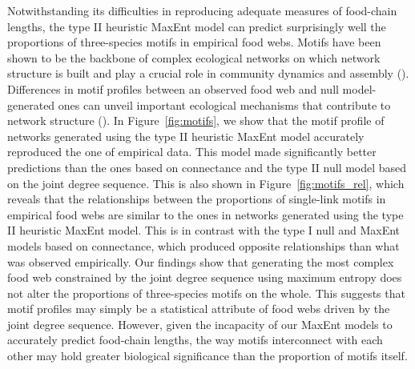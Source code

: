 Notwithstanding its difficulties in reproducing adequate measures of food-chain
lengths, the type II heuristic MaxEnt model can predict surprisingly well the
proportions of three-species motifs in empirical food webs. Motifs have been
shown to be the backbone of complex ecological networks on which network
structure is built and play a crucial role in community dynamics and assembly
(\cite{Stouffer2011Compartmentalization}). Differences in motif profiles between an observed
food web and null model-generated ones can unveil important ecological
mechanisms that contribute to network structure (\cite{Stouffer2007Evidence}). In
Figure~\ref{fig:motifs}, we show that the motif profile of networks generated using the
type II heuristic MaxEnt model accurately reproduced the one of empirical data.
This model made significantly better predictions than the ones based on
connectance and the type II null model based on the joint degree sequence. This
is also shown in Figure~\ref{fig:motifs_rel}, which reveals that the relationships
between the proportions of single-link motifs in empirical food webs are similar
to the ones in networks generated using the type II heuristic MaxEnt model. This
is in contrast with the type I null and MaxEnt models based on connectance,
which produced opposite relationships than what was observed empirically. Our
findings show that generating the most complex food web constrained by the joint
degree sequence using maximum entropy does not alter the proportions of
three-species motifs on the whole. This suggests that motif profiles may simply
be a statistical attribute of food webs driven by the joint degree sequence.
However, given the incapacity of our MaxEnt models to accurately predict
food-chain lengths, the way motifs interconnect with each other may hold greater
biological significance than the proportion of motifs itself. 

